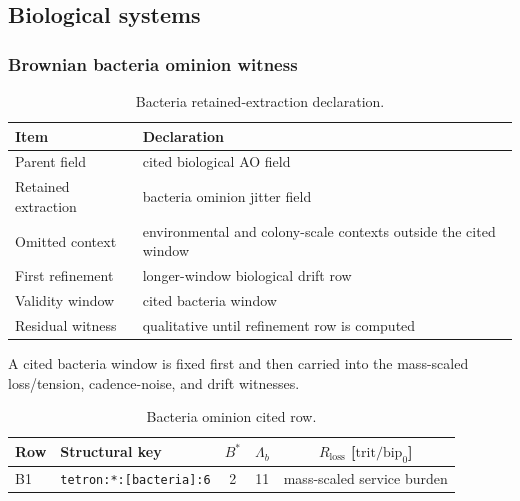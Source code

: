 \subsection{Biological systems}

\subsubsection{Brownian bacteria ominion witness}
\label{man:brownian-bacteria-witness}

\begin{table}[H]
\centering
\caption{Bacteria retained-extraction declaration.}
\label{tab:bacteria-retention}
\begin{threeparttable}
\begin{tabularx}{\linewidth}{@{}lX@{}}
\toprule
Item & Declaration \\
\midrule
Parent field & cited biological AO field \\
Retained extraction & bacteria ominion jitter field \\
Omitted context & environmental and colony-scale contexts outside the cited window \\
First refinement & longer-window biological drift row \\
Validity window & cited bacteria window \\
Residual witness & qualitative until refinement row is computed \\
\bottomrule
\end{tabularx}
\end{threeparttable}
\end{table}

A cited bacteria window is fixed first and then carried into the mass-scaled loss/tension, cadence-noise, and drift witnesses.

\begin{table}[H]
\centering
\caption{Bacteria ominion cited row.}
\label{tab:bacteria-ominion-row}
\begin{threeparttable}
\small
\begin{tabularx}{\linewidth}{@{}lXccc@{}}
\toprule
Row & Structural key & $B^*$ & $\Lambda_b$ & $R_{\mathrm{loss}}$ [\(\mathrm{trit}/\mathrm{bip}_0\)] \\
\midrule
B1 & \texttt{tetron:*:[bacteria]:6} & 2 & 11 & mass-scaled service burden \\
\bottomrule
\end{tabularx}
\end{threeparttable}
\end{table}


